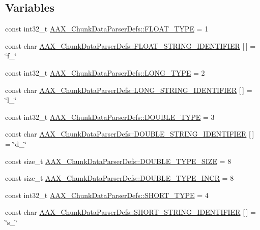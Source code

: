 \subsection*{Variables}
\begin{DoxyCompactItemize}
\item 
const int32\+\_\+t \hyperlink{a00321_ad5dab97f040a4e216054bec18a3a3848}{A\+A\+X\+\_\+\+Chunk\+Data\+Parser\+Defs\+::\+F\+L\+O\+A\+T\+\_\+\+T\+Y\+P\+E} = 1
\item 
const char \hyperlink{a00321_a8340a22e9392091da5acf3bbbea18fc6}{A\+A\+X\+\_\+\+Chunk\+Data\+Parser\+Defs\+::\+F\+L\+O\+A\+T\+\_\+\+S\+T\+R\+I\+N\+G\+\_\+\+I\+D\+E\+N\+T\+I\+F\+I\+E\+R} \mbox{[}$\,$\mbox{]} = \char`\"{}f\+\_\+\char`\"{}
\item 
const int32\+\_\+t \hyperlink{a00321_a228099aae2d4442465b8d8ba67d832c7}{A\+A\+X\+\_\+\+Chunk\+Data\+Parser\+Defs\+::\+L\+O\+N\+G\+\_\+\+T\+Y\+P\+E} = 2
\item 
const char \hyperlink{a00321_af53f70a76b16ae3e06cd38515f3842e1}{A\+A\+X\+\_\+\+Chunk\+Data\+Parser\+Defs\+::\+L\+O\+N\+G\+\_\+\+S\+T\+R\+I\+N\+G\+\_\+\+I\+D\+E\+N\+T\+I\+F\+I\+E\+R} \mbox{[}$\,$\mbox{]} = \char`\"{}l\+\_\+\char`\"{}
\item 
const int32\+\_\+t \hyperlink{a00321_a4724cff14c9b5d97bf3304247c717763}{A\+A\+X\+\_\+\+Chunk\+Data\+Parser\+Defs\+::\+D\+O\+U\+B\+L\+E\+\_\+\+T\+Y\+P\+E} = 3
\item 
const char \hyperlink{a00321_a9875551b1fa5760f6b6d4525d62d7ccc}{A\+A\+X\+\_\+\+Chunk\+Data\+Parser\+Defs\+::\+D\+O\+U\+B\+L\+E\+\_\+\+S\+T\+R\+I\+N\+G\+\_\+\+I\+D\+E\+N\+T\+I\+F\+I\+E\+R} \mbox{[}$\,$\mbox{]} = \char`\"{}d\+\_\+\char`\"{}
\item 
const size\+\_\+t \hyperlink{a00321_a485cccfc704f0da8c1d25aa0ba5723ab}{A\+A\+X\+\_\+\+Chunk\+Data\+Parser\+Defs\+::\+D\+O\+U\+B\+L\+E\+\_\+\+T\+Y\+P\+E\+\_\+\+S\+I\+Z\+E} = 8
\item 
const size\+\_\+t \hyperlink{a00321_aaa27d90baca7ee4caaeab126c56ff76f}{A\+A\+X\+\_\+\+Chunk\+Data\+Parser\+Defs\+::\+D\+O\+U\+B\+L\+E\+\_\+\+T\+Y\+P\+E\+\_\+\+I\+N\+C\+R} = 8
\item 
const int32\+\_\+t \hyperlink{a00321_a4e1dca1df2ca60f4325cddbbc7556121}{A\+A\+X\+\_\+\+Chunk\+Data\+Parser\+Defs\+::\+S\+H\+O\+R\+T\+\_\+\+T\+Y\+P\+E} = 4
\item 
const char \hyperlink{a00321_a5d6864069bd1e6c2850bee584b6246c8}{A\+A\+X\+\_\+\+Chunk\+Data\+Parser\+Defs\+::\+S\+H\+O\+R\+T\+\_\+\+S\+T\+R\+I\+N\+G\+\_\+\+I\+D\+E\+N\+T\+I\+F\+I\+E\+R} \mbox{[}$\,$\mbox{]} = \char`\"{}s\+\_\+\char`\"{}

\end{DoxyCompactItemize}

